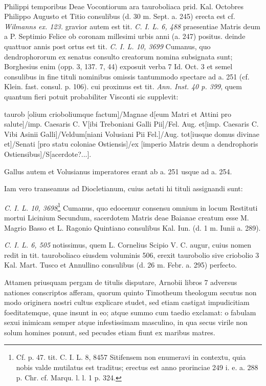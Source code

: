 \documentclass[a4paper, 11pt, oneside, polutonikogreek, german]{article}
\begin{document}
\paragraph{}
Philippi temporibus Deae Vocontiorum ara tauroboliaca prid. Kal. Octobres Philippo Augusto et Titio consulibus (d. 30 m. Sept. a. 245) erecta est cf. \emph{Wilmanns ex. 123.} gravior autem est tit. \emph{C. I. L. 6, 488} praesentiae Matris deum a P. Septimio Felice ob coronam millesimi urbis anni (a. 247) positus. deinde quattuor annis post ortus est tit. \emph{C. I. L. 10, 3699} Cumanus, quo dendrophororum ex senatus consulto creatorum nomina subsignata sunt; Borghesius enim (opp. 3, 137. 7, 44) exposuit verba 7 Id. Oct. 3 et semel consulibus in fine tituli nominibus omissis tantummodo spectare ad a. 251 (cf. Klein. fast. consul. p. 106). cui proximus est tit. \emph{Ann. Inst. 40 p. 399}, quem quantum fieri potuit probabiliter Visconti sic supplevit:

taurob [olium crioboliumque factum]/Magnae d[eum Matri et Attini pro salute]/imp. Caesaris C. V[ibi Treboniani Galli Pii]/Fel. Aug. et[imp. Caesaris C. Vibi Asinii Galli]/Veldum[niani Volusiani Pii Fel.]/Aug. tot[iusque domus divinae et]/Senati [pro statu coloniae Ostiensis]/ex [imperio Matris deum a dendrophoris Ostiensibus]/S[acerdote?...].

Gallus autem et Volusianus imperatores erant ab a. 251 usque ad a. 254.

Iam vero transeamus ad Diocletianum, cuius aetati hi tituli assignandi sunt:

\emph{C. I. L. 10, 3698}\footnote{Cf. p. 47. tit. C. I. L. 8, 8457 Sitifensem non enumeravi in contextu, quia nobis valde mutilatus est traditus; erectus est anno prorinciae 249 i. e. a. 288 p. Chr. cf. Marqu. l. l. 1 p. 324.} Cumanus, quo edocemur consensu omnium in locum Restituti mortui Licinium Secundum, sacerdotem Matris deae Baianae creatum esse M. Magrio Basso et L. Ragonio Quintiano consulibus Kal. Iun. (d. 1 m. Iunii a. 289).

\emph{C. I. L. 6, 505} notissimus, quem L. Cornelius Scipio V. C. augur, cuius nomen redit in tit. tauroboliaco eiusdem voluminis 506, erexit taurobolio sive criobolio 3 Kal. Mart. Tusco et Annullino consulibus (d. 26 m. Febr. a. 295) perfecto.

Attamen priusquam pergam de titulis disputare, Arnobii libros 7 adversus nationes conscriptos afferam, quorum quinto Timotheum theologum secutus non modo originera nostri cultus explicare studet, sed etiam castigat impudicitiam foeditatemque, quae insunt in eo; atque summo cum taedio exclamat: o fabulam sexui inimicam semper atque infestissimam masculino, in qua secus virile non solum homines ponunt, sed pecudes etiam fiunt ex maribus matres.
\end{document}
